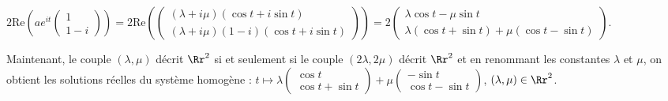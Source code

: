 {\begin{enumerate}
{\begin{center}
$2\text{Re}\left(ae^{it}\left(
\begin{array}{c}
1\\
1-i
\end{array}
\right)\right)=2\text{Re}\left(\left(
\begin{array}{c}
(\lambda+i\mu)(\cos t+i\sin t)\\
(\lambda+i\mu)(1-i)(\cos t+i\sin t)
\end{array}
\right)\right)=2\left(
\begin{array}{c}
\lambda\cos t-\mu\sin t\\
\lambda(\cos t+\sin t)+\mu(\cos t-\sin t)
\end{array}
\right)$.
\end{center}

Maintenant, le couple $(\lambda,\mu)$ décrit $\Rr^2$ si et seulement si le couple $(2\lambda,2\mu)$ décrit $\Rr^2$ et en renommant les constantes $\lambda$ et $\mu$, on obtient les solutions réelles du système homogène : $t\mapsto\lambda\left(\begin{array}{c}
\cos t\\
\cos t+\sin t
\end{array}
\right)+\mu\left(\begin{array}{c}
-\sin t\\
\cos t-\sin t
\end{array}
\right)$, $(\lambda,\mu)\in\Rr^2$.

}
\end{enumerate}}
